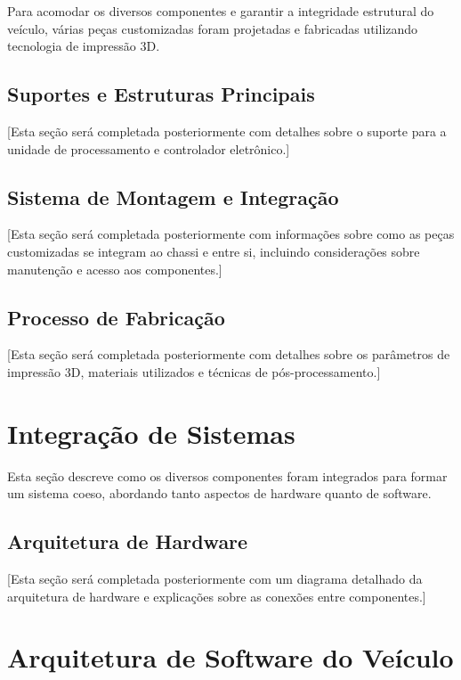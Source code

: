 Para acomodar os diversos componentes e garantir a integridade estrutural do
veículo, várias peças customizadas foram projetadas e fabricadas utilizando
tecnologia de impressão 3D.

\subsection{Suportes e Estruturas Principais}

[Esta seção será completada posteriormente com detalhes sobre o suporte para a unidade de processamento e controlador eletrônico.]

\subsection{Sistema de Montagem e Integração}

[Esta seção será completada posteriormente com informações sobre como as peças customizadas se integram ao chassi e entre si, incluindo considerações sobre manutenção e acesso aos componentes.]

\subsection{Processo de Fabricação}

[Esta seção será completada posteriormente com detalhes sobre os parâmetros de impressão 3D, materiais utilizados e técnicas de pós-processamento.]

\section{Integração de Sistemas}

Esta seção descreve como os diversos componentes foram integrados para formar
um sistema coeso, abordando tanto aspectos de hardware quanto de software.

\subsection{Arquitetura de Hardware}

[Esta seção será completada posteriormente com um diagrama detalhado da arquitetura de hardware e explicações sobre as conexões entre componentes.]

\section{Arquitetura de Software do Veículo}

